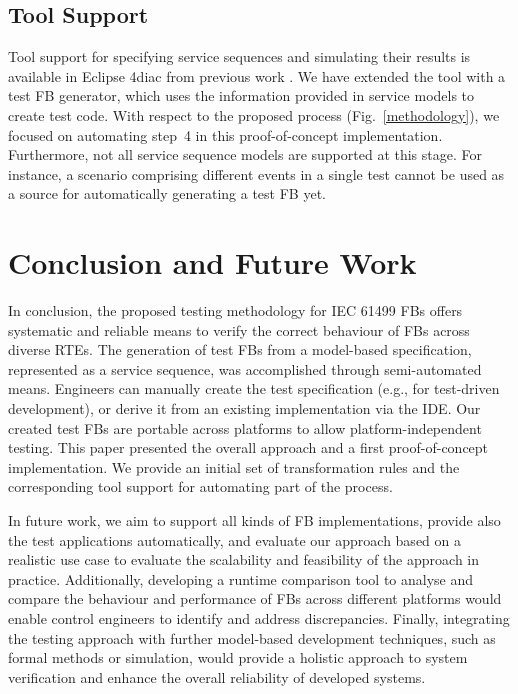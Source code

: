 \documentclass[conference]{IEEEtran}
\begin{document}
\subsection{Tool Support}
Tool support for specifying service sequences and simulating their results is available in Eclipse 4diac \cite{eclipse4diac} from previous work \cite{wiesmayr2021}. We have extended the tool with a test FB generator, which uses the information provided in service models to create test code. With respect to the proposed process (Fig.~\ref{methodology}), we focused on automating step~4 in this proof-of-concept implementation. Furthermore, not all service sequence models are supported at this stage. For instance, a scenario comprising different events in a single test cannot be used as a source for automatically generating a test FB yet.

\section{Conclusion and Future Work}
In conclusion, the proposed testing methodology for IEC 61499 FBs offers systematic and reliable means to verify the correct behaviour of FBs across diverse RTEs. The generation of test FBs from a model-based specification, represented as a service sequence, was accomplished through semi-automated means. Engineers can manually create the test specification (e.g., for test-driven development), or derive it from an existing implementation via the IDE. Our created test FBs are portable across platforms to allow platform-independent testing. This paper presented the overall approach and a first proof-of-concept implementation. We provide an initial set of transformation rules and the corresponding tool support for automating part of the process.

In future work, we aim to support all kinds of FB implementations, provide also the test applications automatically, and evaluate our approach based on a realistic use case to evaluate the scalability and feasibility of the approach in practice. Additionally, developing a runtime comparison tool to analyse and compare the behaviour and performance of FBs across different platforms would enable control engineers to identify and address discrepancies. Finally, integrating the testing approach with further model-based development techniques, such as formal methods or simulation, would provide a holistic approach to system verification and enhance the overall reliability of developed systems.



\end{document}
